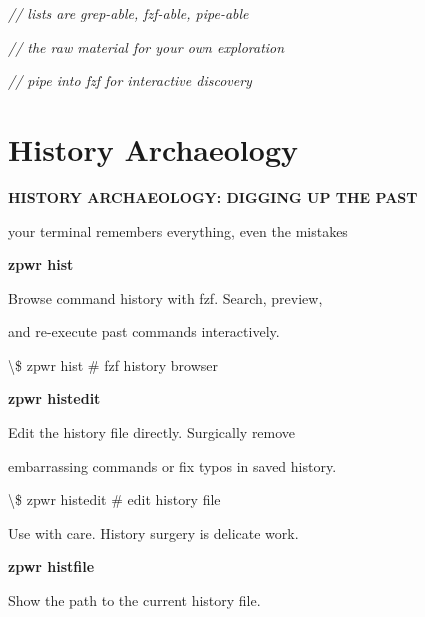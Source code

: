 \documentclass[11pt,a4paper,twoside]{book}
\begin{document}
{\small\itshape\color{dimtext} // lists are grep-able, fzf-able, pipe-able}

{\small\itshape\color{dimtext} // the raw material for your own exploration}

{\small\itshape\color{dimtext} // pipe into fzf for interactive discovery}


\vspace{16pt}

\section{History Archaeology}


\vspace{10pt}
{\large\bfseries\color{neoncyan} HISTORY ARCHAEOLOGY: DIGGING UP THE PAST}\vspace{6pt}

your terminal remembers everything, even the mistakes


\vspace{12pt}
{\bfseries\color{neonyellow} zpwr hist}\vspace{4pt}

Browse command history with fzf. Search, preview,

and re-execute past commands interactively.

\begin{codebox}
\textbackslash{}\$ zpwr hist                   \# fzf history browser\\
\end{codebox}


\vspace{12pt}
{\bfseries\color{neonyellow} zpwr histedit}\vspace{4pt}

Edit the history file directly. Surgically remove

embarrassing commands or fix typos in saved history.

\begin{codebox}
\textbackslash{}\$ zpwr histedit               \# edit history file\\
\end{codebox}

Use with care. History surgery is delicate work.


\vspace{12pt}
{\bfseries\color{neonyellow} zpwr histfile}\vspace{4pt}

Show the path to the current history file.
\end{document}
